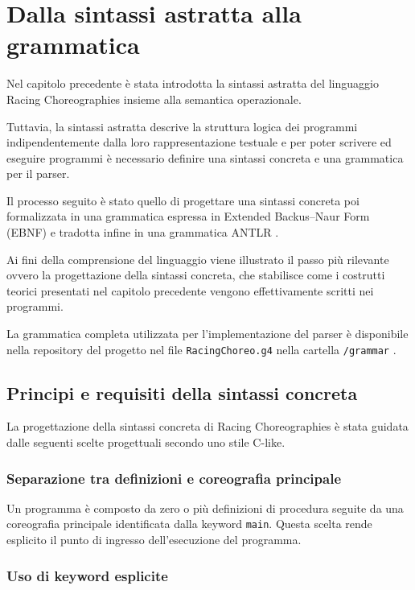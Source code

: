 \chapter{Dalla sintassi astratta alla grammatica}

Nel capitolo precedente è stata introdotta la sintassi astratta del linguaggio Racing Choreographies insieme alla semantica operazionale.

Tuttavia, la sintassi astratta descrive la struttura logica dei programmi indipendentemente dalla loro rappresentazione testuale e per poter scrivere ed eseguire programmi è necessario definire una sintassi concreta e una grammatica per il parser.

Il processo seguito è stato quello di progettare una sintassi concreta poi formalizzata in una grammatica espressa in Extended Backus--Naur Form (EBNF) e tradotta infine in una grammatica ANTLR \cite{antlr4tool}.

Ai fini della comprensione del linguaggio viene illustrato il passo più rilevante ovvero la progettazione della sintassi concreta, che stabilisce come i costrutti teorici presentati nel capitolo precedente vengono effettivamente scritti nei programmi.

La grammatica completa utilizzata per l’implementazione del parser è disponibile nella repository del progetto nel file \texttt{RacingChoreo.g4} nella cartella \texttt{/grammar} \cite{rcparserrepo}.

\section{Principi e requisiti della sintassi concreta}

La progettazione della sintassi concreta di Racing Choreographies è stata guidata dalle seguenti scelte progettuali secondo uno stile C-like.

\subsection*{Separazione tra definizioni e coreografia principale}

Un programma è composto da zero o più definizioni di procedura seguite da una coreografia principale identificata dalla keyword \texttt{main}. Questa scelta rende esplicito il punto di ingresso dell’esecuzione del programma.

\subsection*{Uso di keyword esplicite}

